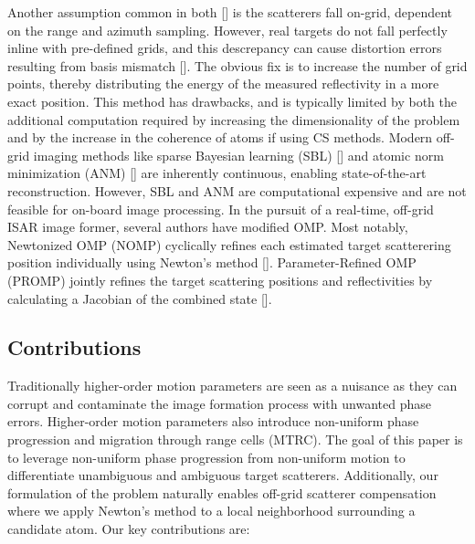 
Another assumption common in both [] is the scatterers fall on-grid, dependent on the range and azimuth sampling. However, real targets do not fall perfectly inline with pre-defined grids, and this descrepancy can cause distortion errors resulting from basis mismatch []. The obvious fix is to increase the number of grid points, thereby distributing the energy of the measured reflectivity in a more exact position. This method has drawbacks, and is typically limited by both the additional computation required by increasing the dimensionality of the problem and by the increase in the coherence of atoms if using CS methods. Modern off-grid imaging methods like sparse Bayesian learning (SBL) [] and atomic norm minimization (ANM) [] are inherently continuous, enabling state-of-the-art reconstruction. However, SBL and ANM are computational expensive and are not feasible for on-board image processing.  In the pursuit of a real-time, off-grid ISAR image former, several authors have modified OMP. Most notably, Newtonized OMP (NOMP) cyclically refines each estimated target scatterering position individually using Newton's method []. Parameter-Refined OMP (PROMP) jointly refines the target scattering positions and reflectivities by calculating a Jacobian of the combined state [].


\subsection{Contributions}

Traditionally higher-order motion parameters are seen as a nuisance as they can corrupt and contaminate the image formation process with unwanted phase errors. Higher-order motion parameters also introduce non-uniform phase progression and migration through range cells (MTRC). The goal of this paper is to leverage non-uniform phase progression from non-uniform motion to differentiate unambiguous and ambiguous target scatterers. Additionally, our formulation of the problem naturally enables off-grid scatterer compensation where we apply Newton's method to a local neighborhood surrounding a candidate atom. Our key contributions are:

